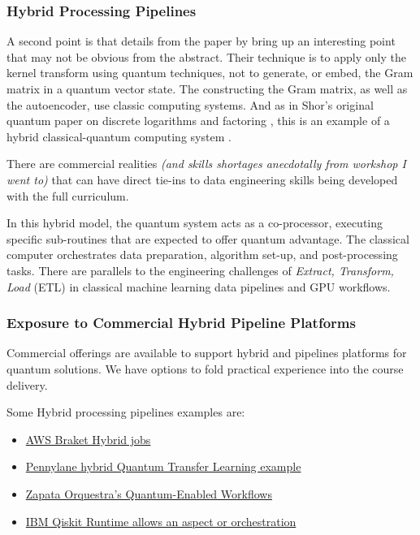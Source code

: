 \subsubsection{Hybrid Processing Pipelines}

A second point is that details from the paper by \citeauthor{Kyriienko:2022} 
bring up an interesting point that may not be obvious from the abstract. 
Their technique is to apply only the kernel transform using quantum techniques, 
not to generate, or embed, the Gram matrix in a quantum vector state.
The constructing the Gram matrix, as well as the autoencoder, use classic computing systems. 
And as in Shor's original quantum paper on discrete logarithms and factoring \cite{Shor:1997},
this is an example of a hybrid classical-quantum computing system \cite{Preskill:2023}.

There are commercial realities \emph{(and skills shortages anecdotally from workshop I went to)}
that can have direct tie-ins to data engineering skills being developed with the full curriculum.

In this hybrid model, 
the quantum system acts as a co-processor, executing specific sub-routines that are expected to offer quantum advantage.
The classical computer orchestrates data preparation, algorithm set-up, and post-processing tasks.
There are parallels to the engineering challenges of \emph{Extract, Transform, Load} (ETL) 
in classical machine learning data pipelines and GPU workflows.

\subsubsection{Exposure to Commercial Hybrid Pipeline Platforms}

Commercial offerings are available to support hybrid and pipelines platforms for quantum solutions.
We have options to fold practical experience into the course delivery.

Some Hybrid processing pipelines examples are:
\begin{itemize}
	\item \href{https://docs.aws.amazon.com/braket/latest/developerguide/braket-what-is-hybrid-job.html}
	{AWS Braket Hybrid jobs}
	\item \href{https://pennylane.ai/qml/demos/tutorial_quantum_transfer_learning}
	{Pennylane hybrid Quantum Transfer Learning example}
	\item \href{https://ml2quantum.com/2020/05/22/zapata-orquestra/}
	{Zapata Orquestra's Quantum-Enabled Workflows}
	\item \href{https://docs.quantum.ibm.com/api/qiskit-ibm-runtime/0.16/runtime-service
	}{IBM Qiskit Runtime allows an aspect or orchestration}
\end{itemize}

